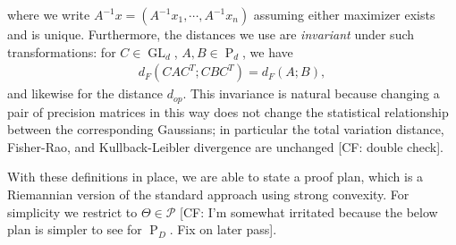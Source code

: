 \documentclass{article}
\DeclarePairedDelimiter{\norm}{\lVert}{\rVert}
\renewcommand{\vec}{\bm}
\newcommand\PD{\operatorname{P}}
\newcommand\SPD{\mathcal{P}}
\newcommand\samp{x}
\newcommand\GL{\operatorname{GL}}
\newcommand\tr{\operatorname{Tr}}
\newcommand{\CF}[1]{{\color{purple}[CF: #1]}}
\newcommand{\MW}[1]{{\color{red}[MW: #1]}}
\begin{document}
where we write $A^{-1} \samp = (A^{-1} \samp_1,\cdots,A^{-1} \samp_n)$
 assuming either maximizer exists and is unique. Furthermore, the distances we use are \emph{invariant} under such transformations: for $C \in \GL_d$, $A, B \in \PD_d$, we have 
 \begin{align*}
  d_F(C A C^T; C B C^T)
= d_F(A; B),
\end{align*}
and likewise for the distance $d_{op}$. This invariance is natural because changing a pair of precision matrices in this way does not change the statistical relationship between the corresponding Gaussians; in particular the total variation distance, Fisher-Rao, and Kullback-Leibler divergence are unchanged \CF{double check}.
 
 

With these definitions in place, we are able to state a proof plan, which is a Riemannian version of the standard approach using strong convexity. For simplicity we restrict to $\Theta \in \SPD$ \CF{I'm somewhat irritated because the below plan is simpler to see for $\PD_D$. Fix on later pass}.
\end{document}
